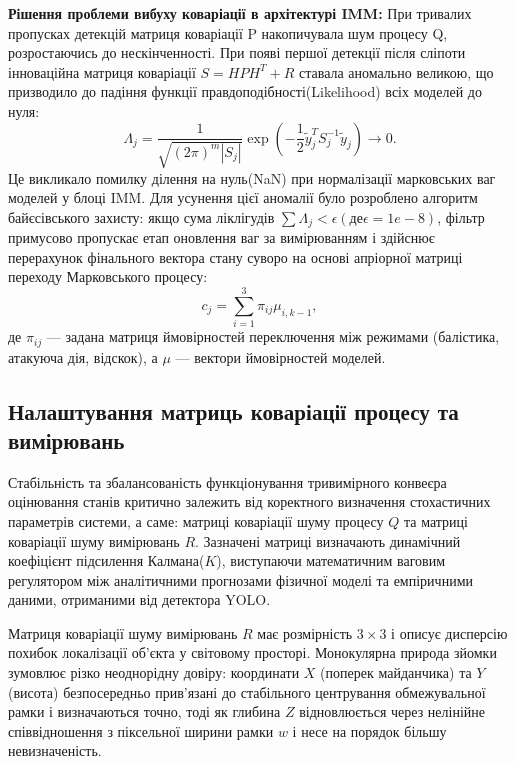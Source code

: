 \textbf{Рішення проблеми вибуху коваріації в архітектурі \gls{IMM}:} При
тривалих пропусках детекцій матриця коваріації P накопичувала шум процесу
Q, розростаючись до нескінченності. При появі першої детекції після сліпоти
інноваційна матриця коваріації $S = H P H^T + R$ ставала аномально великою,
що призводило до падіння функції правдоподібності(Likelihood) всіх моделей
до нуля:
\begin{equation}\Lambda_j = \frac{1}{\sqrt{(2\pi)^m |S_j|}} \exp\left(- \frac{1}{2} \tilde{y}_j^T S_j^{-1}
\tilde{y}_j \right) \rightarrow 0.\end{equation}
Це викликало помилку ділення на нуль(NaN) при нормалізації
марковських ваг моделей у блоці \gls{IMM}. Для усунення цієї аномалії було
розроблено алгоритм байєсівського захисту: якщо сума ліклігудів $\sum
\Lambda_j < \epsilon (де \epsilon = 1e-8)$, фільтр примусово пропускає етап
оновлення ваг за вимірюванням і здійснює перерахунок фінального вектора
стану суворо на основі апріорної матриці переходу Марковського процесу:
\begin{equation}c_j = \sum_{i=1}^3 \pi_{ij} \mu_{i, k-1},\end{equation}
де $\pi_{ij}$ — задана матриця ймовірностей переключення між
режимами (балістика, атакуюча дія, відскок), а $\mu$ — вектори ймовірностей
моделей.

\subsection{Налаштування матриць коваріації процесу та вимірювань}

Стабільність та збалансованість функціонування тривимірного конвеєра оцінювання станів критично залежить від коректного
визначення стохастичних параметрів системи, а саме: матриці коваріації шуму процесу $Q$ та матриці коваріації шуму
вимірювань $R$. Зазначені матриці визначають динамічний коефіцієнт підсилення Калмана($K$), виступаючи математичним
ваговим регулятором між аналітичними прогнозами фізичної моделі та емпіричними даними, отриманими від детектора
\gls{YOLO}.

Матриця коваріації шуму вимірювань $R$ має розмірність $3 \times 3$ і описує
дисперсію похибок локалізації об'єкта у світовому просторі. Монокулярна природа
зйомки зумовлює різко неоднорідну довіру: координати $X$ (поперек майданчика) та
$Y$ (висота) безпосередньо прив'язані до стабільного центрування обмежувальної
рамки і визначаються точно, тоді як глибина $Z$ відновлюється через нелінійне
співвідношення з піксельної ширини рамки $w$ і несе на порядок більшу
невизначеність.

